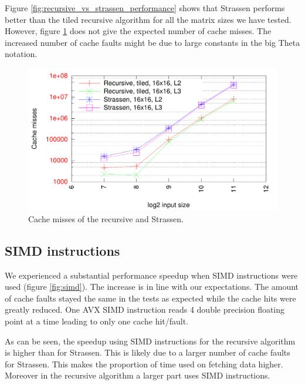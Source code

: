 Figure \ref{fig:recursive_vs_strassen_performance} shows that Strassen performs better than the tiled recursive algorithm for all the matrix sizes we have tested. However, figure \ref{fig:recursive_vs_strassen_cache} does not give the expected number of cache misses. The increased number of cache faults might be due to large constants in the big Theta notation.

\begin{figure}[h!]
  \centering
  \includegraphics[width=\textwidth]{"../project2/gnuplots/recursive_vs_strassen_cache"}
  \caption{Cache misses of the recursive and Strassen.}
  \label{fig:recursive_vs_strassen_cache}
\end{figure}

\subsection{SIMD instructions}

We experienced a substantial performance speedup when SIMD instructions were used (figure \ref{fig:simd}). The increase is in line with our expectations. The amount of cache faults stayed the same in the tests as expected while the cache hits were greatly reduced. One AVX SIMD instruction reads 4 double precision floating point at a time leading to only one cache hit/fault.

As can be seen, the speedup using SIMD instructions for the recursive algorithm is higher than for Strassen. This is likely due to a larger number of cache faults for Strassen. This makes the proportion of time used on fetching data higher. Moreover in the recursive algorithm a larger part uses SIMD instructions.


